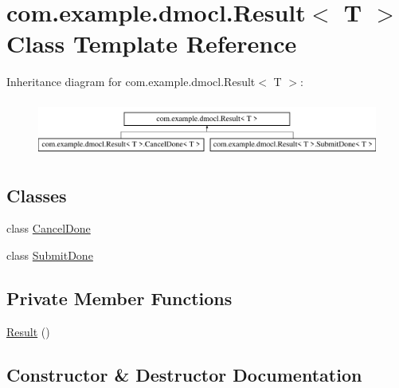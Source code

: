 \hypertarget{classcom_1_1example_1_1dmocl_1_1Result}{}\section{com.\+example.\+dmocl.\+Result$<$ T $>$ Class Template Reference}
\label{classcom_1_1example_1_1dmocl_1_1Result}
Inheritance diagram for com.\+example.\+dmocl.\+Result$<$ T $>$\+:\begin{figure}[H]
\begin{center}
\leavevmode
\includegraphics[height=1.842105cm]{classcom_1_1example_1_1dmocl_1_1Result}
\end{center}
\end{figure}
\subsection*{Classes}
\begin{DoxyCompactItemize}
\item 
class \mbox{\hyperlink{classcom_1_1example_1_1dmocl_1_1Result_1_1CancelDone}{Cancel\+Done}}
\item 
class \mbox{\hyperlink{classcom_1_1example_1_1dmocl_1_1Result_1_1SubmitDone}{Submit\+Done}}
\end{DoxyCompactItemize}
\subsection*{Private Member Functions}
\begin{DoxyCompactItemize}
\item 
\mbox{\hyperlink{classcom_1_1example_1_1dmocl_1_1Result_a4a09f6497f1c42c20a9303aec364726d}{Result}} ()
\end{DoxyCompactItemize}


\subsection{Constructor \& Destructor Documentation}
\mbox{\label{classcom_1_1example_1_1dmocl_1_1Result_a4a09f6497f1c42c20a9303aec364726d}} 
